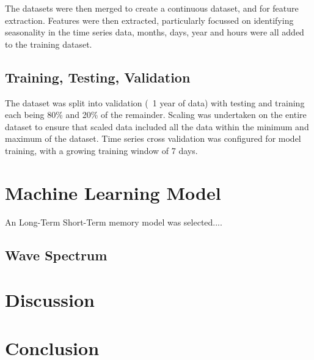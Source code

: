 \documentclass[a4paper,fleqn]{cas-sc}
\begin{document}
The datasets were then merged to create a continuous dataset, and for feature extraction. Features were then extracted, particularly focussed on identifying seasonality in the time series data, months, days, year and hours were all added to the training dataset. 

\subsection{Training, Testing, Validation}
The dataset was split into validation (~1 year of data) with testing and training each being 80\% and 20\% of the remainder. Scaling was undertaken on the entire dataset to ensure that scaled data included all the data within the minimum and maximum of the dataset. 
Time series cross validation was configured for model training, with a growing training window of 7 days.

\section{Machine Learning Model}
An Long-Term Short-Term memory model was selected....

\subsection{Wave Spectrum}\label{introspec}




\section{Discussion}\label{disc}


\section{Conclusion}\label{con}



\end{document}
